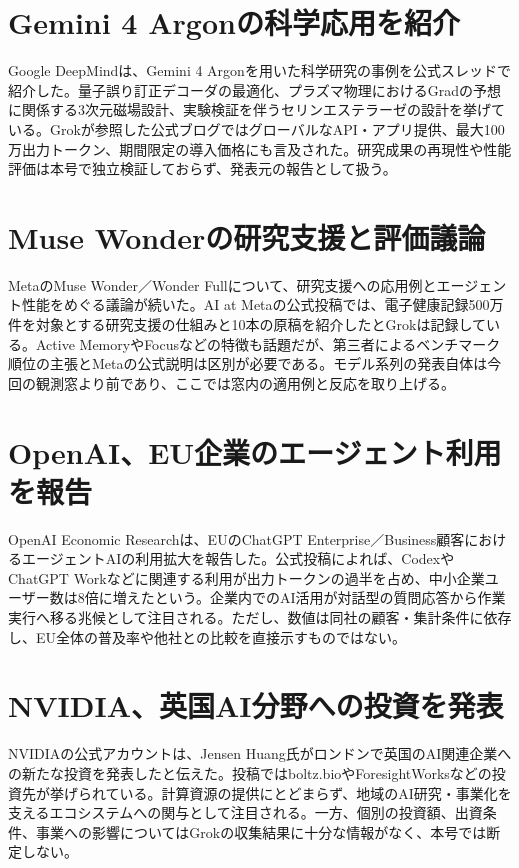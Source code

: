 \section{Gemini 4 Argonの科学応用を紹介}
Google DeepMindは、Gemini 4 Argonを用いた科学研究の事例を公式スレッドで紹介した。量子誤り訂正デコーダの最適化、プラズマ物理におけるGradの予想に関係する3次元磁場設計、実験検証を伴うセリンエステラーゼの設計を挙げている。Grokが参照した公式ブログではグローバルなAPI・アプリ提供、最大100万出力トークン、期間限定の導入価格にも言及された。研究成果の再現性や性能評価は本号で独立検証しておらず、発表元の報告として扱う。

\section{Muse Wonderの研究支援と評価議論}
MetaのMuse Wonder／Wonder Fullについて、研究支援への応用例とエージェント性能をめぐる議論が続いた。AI at Metaの公式投稿では、電子健康記録500万件を対象とする研究支援の仕組みと10本の原稿を紹介したとGrokは記録している。Active MemoryやFocusなどの特徴も話題だが、第三者によるベンチマーク順位の主張とMetaの公式説明は区別が必要である。モデル系列の発表自体は今回の観測窓より前であり、ここでは窓内の適用例と反応を取り上げる。

\section{OpenAI、EU企業のエージェント利用を報告}
OpenAI Economic Researchは、EUのChatGPT Enterprise／Business顧客におけるエージェントAIの利用拡大を報告した。公式投稿によれば、CodexやChatGPT Workなどに関連する利用が出力トークンの過半を占め、中小企業ユーザー数は8倍に増えたという。企業内でのAI活用が対話型の質問応答から作業実行へ移る兆候として注目される。ただし、数値は同社の顧客・集計条件に依存し、EU全体の普及率や他社との比較を直接示すものではない。

\section{NVIDIA、英国AI分野への投資を発表}
NVIDIAの公式アカウントは、Jensen Huang氏がロンドンで英国のAI関連企業への新たな投資を発表したと伝えた。投稿ではboltz.bioやForesightWorksなどの投資先が挙げられている。計算資源の提供にとどまらず、地域のAI研究・事業化を支えるエコシステムへの関与として注目される。一方、個別の投資額、出資条件、事業への影響についてはGrokの収集結果に十分な情報がなく、本号では断定しない。

